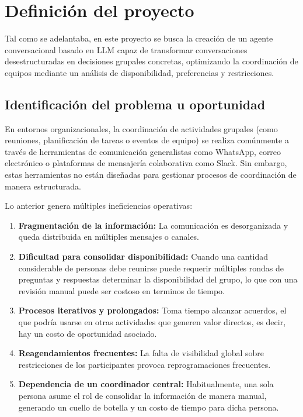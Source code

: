 \section{Definición del proyecto}

Tal como se adelantaba, en este proyecto se busca la creación de un agente conversacional basado en LLM capaz de transformar conversaciones desestructuradas en decisiones grupales concretas, optimizando la coordinación de equipos mediante un análisis de disponibilidad, preferencias y restricciones.

\subsection{Identificación del problema u oportunidad}

En entornos organizacionales, la coordinación de actividades grupales (como reuniones, planificación de tareas o eventos de equipo) se realiza comúnmente a través de herramientas de comunicación generalistas como WhatsApp, correo electrónico o plataformas de mensajería colaborativa como Slack. Sin embargo, estas herramientas no están diseñadas para gestionar procesos de coordinación de manera estructurada. 


Lo anterior genera múltiples ineficiencias operativas:

\begin{enumerate}
    \item \textbf{Fragmentación de la información:} La comunicación es desorganizada y queda distribuida en múltiples mensajes o canales.
    
    \item \textbf{Dificultad para consolidar disponibilidad:} Cuando una cantidad considerable de personas debe reunirse puede requerir múltiples rondas de preguntas y respuestas determinar la disponibilidad del grupo, lo que con una revisión manual puede ser costoso en terminos de tiempo.
    
    \item \textbf{Procesos iterativos y prolongados:} Toma tiempo alcanzar acuerdos, el que podría usarse en otras actividades que generen valor directos, es decir, hay un costo de oportunidad asociado.
    
    \item \textbf{Reagendamientos frecuentes:} La falta de visibilidad global sobre restricciones de los participantes provoca reprogramaciones frecuentes.
    
    \item \textbf{Dependencia de un coordinador central:} Habitualmente, una sola persona asume el rol de consolidar la información de manera manual, generando un cuello de botella y un costo de tiempo para dicha persona.
\end{enumerate}

